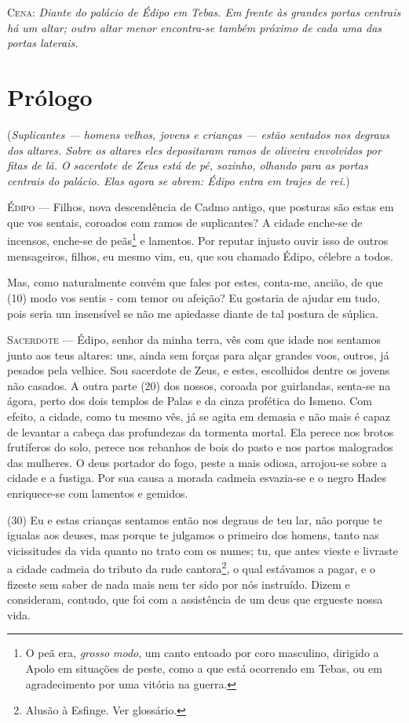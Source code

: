 \textsc{Cena:} \emph{Diante do palácio de Édipo em Tebas. Em frente às grandes
portas centrais há um altar; outro altar menor encontra-se também
próximo de cada uma das portas laterais.}
\bigskip


\section{Prólogo}

(\emph{Suplicantes --- homens velhos, jovens e crianças --- estão sentados
nos degraus dos altares. Sobre os altares eles depositaram ramos de
oliveira envolvidos por fitas de lã. O sacerdote de Zeus está de pé,
sozinho, olhando para as portas centrais do palácio. Elas agora se
abrem: Édipo entra em trajes de rei.})
\bigskip

\textsc{Édipo} --- Filhos, nova descendência de Cadmo antigo, que posturas são estas em que
vos sentais, coroados com ramos de suplicantes? A cidade enche-se de
incensos, enche-se de peãs\footnote{O peã era, \emph{grosso modo}, um 
canto entoado por coro masculino, dirigido a Apolo em situações de 
peste, como a que está ocorrendo em Tebas, ou em agradecimento por uma 
vitória na guerra.} e lamentos. Por reputar injusto ouvir isso de 
outros mensageiros, filhos, eu mesmo vim, eu, que sou chamado Édipo, 
célebre a todos.

Mas, como naturalmente convém que fales por estes, conta-me, ancião, de
que (10) modo vos sentis - com temor ou afeição? Eu gostaria de ajudar
em tudo, pois seria um insensível se não me apiedasse diante de tal
postura de súplica.

\textsc{Sacerdote} --- Édipo, senhor da minha terra, vês com que idade nos sentamos junto aos
teus altares: uns, ainda sem forças para alçar grandes voos, outros, já
pesados pela velhice. Sou sacerdote de Zeus, e estes, escolhidos dentre
os jovens não casados. A outra parte (20) dos nossos, coroada por
guirlandas, senta-se na ágora, perto dos dois templos de Palas e da
cinza profética do Ismeno. Com efeito, a cidade, como tu mesmo vês, já
se agita em demasia e não mais é capaz de levantar a cabeça das
profundezas da tormenta mortal. Ela perece nos brotos frutíferos do
solo, perece nos rebanhos de bois do pasto e nos partos malogrados das
mulheres. O deus portador do fogo, peste a mais odiosa, arrojou-se sobre
a cidade e a fustiga. Por sua causa a morada cadmeia esvazia-se e o
negro Hades enriquece-se com lamentos e gemidos.

(30) Eu e estas crianças sentamos então nos degraus de teu lar, não
porque te igualas aos deuses, mas porque te julgamos o primeiro dos
homens, tanto nas vicissitudes da vida quanto no trato com os numes; tu,
que antes vieste e livraste a cidade cadmeia do tributo da rude
cantora\footnote{Alusão à Esfinge. Ver glossário.}, o qual estávamos a
pagar, e o fizeste sem saber de nada mais nem ter sido por nós
instruído. Dizem e consideram, contudo, que foi com a assistência de um
deus que ergueste nossa vida.

